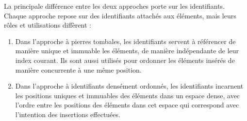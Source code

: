 
La principale différence entre les deux approches porte sur les identifiants.
Chaque approche repose sur des identifiants attachés aux éléments, mais leurs rôles et utilisations diffèrent :
\begin{enumerate}
  \item Dans l'approche à pierres tombales, les identifiants servent à référencer de manière unique et immuable les éléments, \ie de manière indépendante de leur index courant.
    Ils sont aussi utilisés pour ordonner les éléments insérés de manière concurrente à une même position.
  \item Dans l'approche à identifiants densément ordonnés, les identifiants incarnent les positions uniques et immuables des éléments dans un espace dense, avec l'ordre entre les positions des éléments dans cet espace qui correspond avec l'intention des insertions effectuées.
\end{enumerate}

